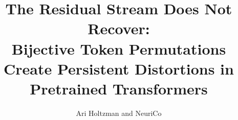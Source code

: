 \documentclass{article}
\title{The Residual Stream Does Not Recover:\\Bijective Token Permutations Create Persistent Distortions in Pretrained Transformers}
\author{Ari Holtzman and NeuriCo}
\begin{document}
\maketitle

\begin{abstract}

\end{abstract}










\end{document}
